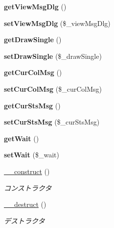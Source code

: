 \begin{DoxyCompactItemize}
{\bfseries get\+View\+Msg\+Dlg} ()
\item 
\mbox{\label{class_reversi_play_ab54d3a395acd14da2fc1b87164a47dc5}} 
{\bfseries set\+View\+Msg\+Dlg} (\$\+\_\+view\+Msg\+Dlg)
\item 
\mbox{\label{class_reversi_play_ae8baa2e8fb1559352eeba9316a1d09fa}} 
{\bfseries get\+Draw\+Single} ()
\item 
\mbox{\label{class_reversi_play_a0b2d3c0923760cf68006ca39af32795d}} 
{\bfseries set\+Draw\+Single} (\$\+\_\+draw\+Single)
\item 
\mbox{\label{class_reversi_play_abffc60511160c4bd45953f0eb735062a}} 
{\bfseries get\+Cur\+Col\+Msg} ()
\item 
\mbox{\label{class_reversi_play_a1bf236c3884ff6e861b1d7aac307bb14}} 
{\bfseries set\+Cur\+Col\+Msg} (\$\+\_\+cur\+Col\+Msg)
\item 
\mbox{\label{class_reversi_play_a6986f6a44635bf7e6153c81b633023e7}} 
{\bfseries get\+Cur\+Sts\+Msg} ()
\item 
\mbox{\label{class_reversi_play_a7b5e5c74e95ae80d98ab164b33696d71}} 
{\bfseries set\+Cur\+Sts\+Msg} (\$\+\_\+cur\+Sts\+Msg)
\item 
\mbox{\label{class_reversi_play_a1d598b9d8ecb45452134acf8da25f537}} 
{\bfseries get\+Wait} ()
\item 
\mbox{\label{class_reversi_play_a1f7e985076ae8fa5a88c5938aa497066}} 
{\bfseries set\+Wait} (\$\+\_\+wait)
\item 
\hyperlink{class_reversi_play_a095c5d389db211932136b53f25f39685}{\+\_\+\+\_\+construct} ()
\begin{DoxyCompactList}\small\item\em コンストラクタ \end{DoxyCompactList}\item 
\hyperlink{class_reversi_play_a421831a265621325e1fdd19aace0c758}{\+\_\+\+\_\+destruct} ()
\begin{DoxyCompactList}\small\item\em デストラクタ \end{DoxyCompactList}\item 

\end{DoxyCompactItemize}
